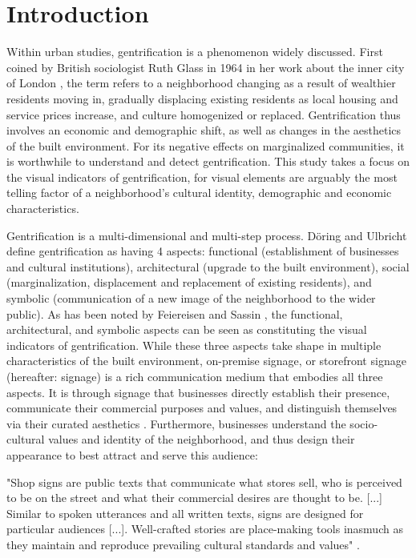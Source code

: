 \section{Introduction}
\label{sec:introduction}

Within urban studies, gentrification is a phenomenon widely discussed. First coined by British sociologist Ruth Glass in 1964 in her work about the inner city of London \cite{Glass1964}, the term refers to a neighborhood changing as a result of wealthier residents moving in, gradually displacing existing residents as local housing and service prices increase, and culture homogenized or replaced. Gentrification thus involves an economic and demographic shift, as well as changes in the aesthetics of the built environment. For its negative effects on marginalized communities, it is worthwhile to understand and detect gentrification. This study takes a focus on the visual indicators of gentrification, for visual elements are arguably the most telling factor of a neighborhood’s cultural identity, demographic and economic characteristics.

Gentrification is a multi-dimensional and multi-step process. Döring and Ulbricht \cite{döring_ulbricht_2018} define gentrification as having 4 aspects: functional (establishment of businesses and cultural institutions), architectural (upgrade to the built environment), social (marginalization, displacement and replacement of existing residents), and symbolic (communication of a new image of the neighborhood to the wider public). As has been noted by Feiereisen and Sassin \cite{feiereisen_sounding_2021}, the functional, architectural, and symbolic aspects can be seen as constituting the visual indicators of gentrification. While these three aspects take shape in multiple characteristics of the built environment, on-premise signage, or storefront signage (hereafter: signage) is a rich communication medium that embodies all three aspects. It is through signage that businesses directly establish their presence, communicate their commercial purposes and values, and distinguish themselves via their curated aesthetics \cite{rahman_signage_2020}. Furthermore, businesses understand the socio-cultural values and identity of the neighborhood, and thus design their appearance to best attract and serve this audience:

\begin{displayquote}
    "Shop signs are public texts that communicate what stores sell, who is perceived to be on the street and what their commercial desires are thought to be. [...] Similar to spoken utterances and all written texts, signs are designed for particular audiences [...]. Well-crafted stories are place-making tools inasmuch as they maintain and reproduce prevailing cultural standards and values" \cite{trinch_signsays_2017}. 
\end{displayquote}


